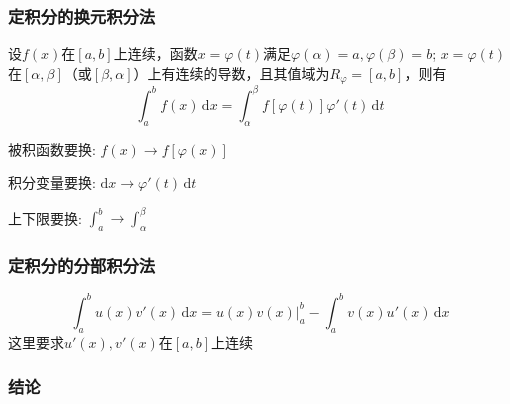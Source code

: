 \documentclass[a4paper,12pt]{article}
\begin{document}
    \subsubsection{定积分的换元积分法}

    设$f(x)$在$[a, b]$上连续，函数$x = \varphi(t)$满足$\varphi(\alpha) = a, \varphi(\beta) = b$; $x = \varphi(t)$在$[\alpha, \beta]$（或$[\beta, \alpha]$）上有连续的导数，且其值域为$R_\varphi = [a, b]$，则有
    \[
        \int_a^b f(x)\,\mathrm{d}x = \int_{\alpha}^{\beta} f[\varphi(t)]\varphi'(t)\,\mathrm{d}t
    \]

    \textbf{\color{red}{换元要三换}}
    \begin{circlenum}
        \item 被积函数要换: $f(x) \rightarrow f[\varphi(x)]$
        \item 积分变量要换: $\mathrm{d}x \rightarrow \varphi'(t)\,\mathrm{d}t$
        \item 上下限要换: $\int_{a}^b \rightarrow \int_{\alpha}^{\beta}$
    \end{circlenum}

    \subsubsection{定积分的分部积分法}

    \[
        \int_a^b u(x)v'(x)\,\mathrm{d}x = u(x)v(x)\Big|_a^b - \int_a^b v(x)u'(x)\,\mathrm{d}x
    \]
    这里要求$u'(x), v'(x)$在$[a, b]$上连续

    \subsubsection{结论}
\end{document}
